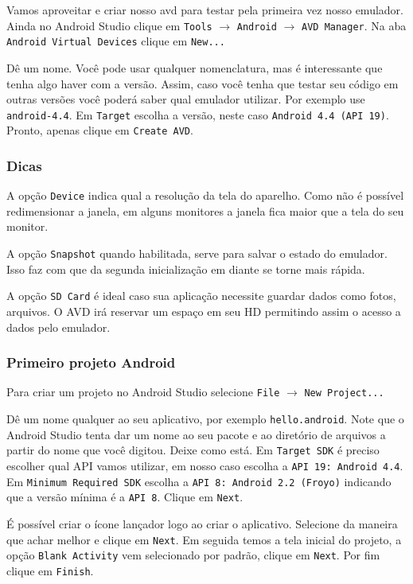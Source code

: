Vamos aproveitar e criar nosso \gls{avd} para testar pela primeira vez
nosso emulador. Ainda no Android Studio clique em \texttt{Tools}
$\rightarrow$ \texttt{Android} $\rightarrow$ \texttt{AVD Manager}. Na
aba \texttt{Android Virtual Devices} clique em \texttt{New...}

Dê um nome. Você pode usar qualquer nomenclatura, mas é interessante que
tenha algo haver com a versão. Assim, caso você tenha que testar seu
código em outras versões você poderá saber qual emulador utilizar. Por
exemplo use \texttt{android-4.4}. Em \texttt{Target} escolha a versão,
neste caso \texttt{Android 4.4 (API 19)}. Pronto, apenas clique em
\texttt{Create AVD}.

\subsubsection{Dicas}

A opção \texttt{Device} indica qual a resolução da tela do aparelho.
Como não é possível redimensionar a janela, em alguns monitores a janela
fica maior que a tela do seu monitor.

A opção \texttt{Snapshot} quando habilitada, serve para salvar o estado
do emulador. Isso faz com que da segunda inicialização em diante se
torne mais rápida.

A opção \texttt{SD Card} é ideal caso sua aplicação necessite guardar
dados como fotos, arquivos. O AVD irá reservar um espaço em seu HD
permitindo assim o acesso a dados pelo emulador.

\subsubsection{Primeiro projeto Android \label{sssec:testando}}

Para criar um projeto no Android Studio selecione \texttt{File}
$\rightarrow$ \texttt{New Project...}

Dê um nome qualquer ao seu aplicativo, por exemplo
\texttt{hello.android}. Note que o Android Studio tenta dar um nome ao
seu pacote e ao diretório de arquivos a partir do nome que você digitou.
Deixe como está. Em \texttt{Target SDK} é preciso escolher qual API
vamos utilizar, em nosso caso escolha a \texttt{API 19: Android 4.4}. Em
\texttt{Minimum Required SDK} escolha a
\texttt{API 8: Android 2.2 (Froyo)} indicando que a versão mínima é a
\texttt{API 8}. Clique em \texttt{Next}.

É possível criar o ícone lançador logo ao criar o aplicativo. Selecione
da maneira que achar melhor e clique em \texttt{Next}. Em seguida temos
a tela inicial do projeto, a opção \texttt{Blank Activity} vem
selecionado por padrão, clique em \texttt{Next}. Por fim clique em
\texttt{Finish}.

